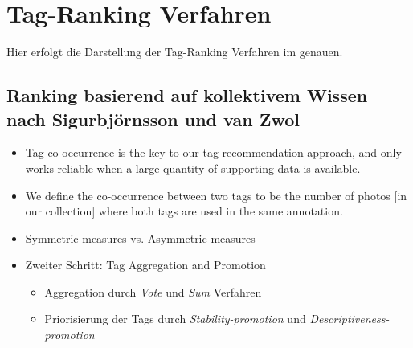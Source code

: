 \section{Tag-Ranking Verfahren} %
\label{sec:tag_ranking_verfahren}
Hier erfolgt die Darstellung der Tag-Ranking Verfahren im genauen.

% 
% 

\subsection{Ranking basierend auf kollektivem Wissen nach Sigurbjörnsson und van Zwol} %
\label{sub:ranking_basierend_auf_kollektivem_wissen_nach_zwol}




\begin{itemize}
  \item Tag co-occurrence is the key to our tag recommendation approach, and only works reliable when a large quantity of supporting data is available.
  \item We define the co-occurrence between two tags to be the number of photos [in our collection] where both tags are used in the same annotation.
  \item Symmetric measures vs. Asymmetric measures
  \item Zweiter Schritt: Tag Aggregation and Promotion
  \begin{itemize}
    \item Aggregation durch \emph{Vote} und \emph{Sum} Verfahren
    \item Priorisierung der Tags durch \emph{Stability-promotion} und \emph{Descriptiveness-promotion}
  \end{itemize}
\end{itemize}

